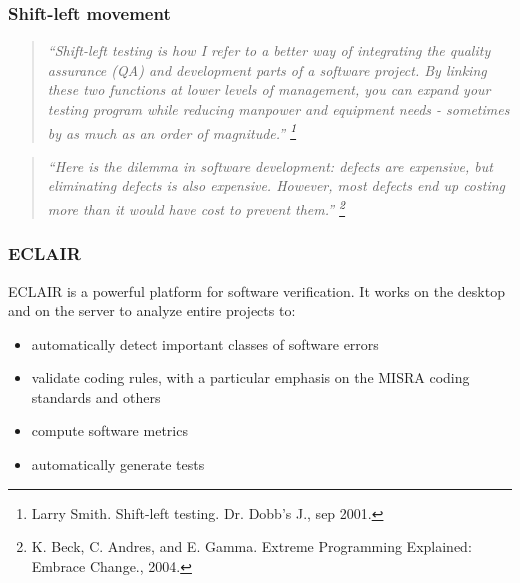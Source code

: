 \documentclass[compress,xcolor={dvipsnames}]{beamer}
\newenvironment{emphcolor}
               {\usebeamercolor[fg]{title}}
               {\usebeamercolor[fg]{text}}
\begin{document}
\begin{frame}
  \frametitle{Shift-left movement}

  \begin{quote}
    \itshape
    ``Shift-left testing is how I refer to a better way of integrating the quality assurance (QA) and development parts of a software project.  By linking these two functions at lower levels of management, you can expand your testing program while reducing manpower and equipment needs - sometimes by as much as an order of magnitude.'' \footnote{Larry Smith. Shift-left testing. Dr. Dobb's J., sep 2001.}
  \end{quote}
  
  \vspace{1em}

  \begin{quote}
    \itshape
    ``Here is the dilemma in software development: defects are expensive, but eliminating defects is also expensive. However, most defects end up costing more than it would have cost to prevent them.'' \footnote{K. Beck, C. Andres, and E. Gamma. Extreme Programming Explained: Embrace Change., 2004.}
  \end{quote}
\end{frame}

\begin{frame}
  \frametitle{ECLAIR}

  ECLAIR is a powerful platform for software verification. It works on the desktop and on the server to analyze entire projects to:
  \begin{itemize}
    \setlength\itemsep{1em}
    \item automatically detect important classes of software errors
      
    \item validate coding rules, with a particular emphasis on the \begin{emphcolor}MISRA coding standards\end{emphcolor} and others
    
    \item compute software metrics

    \item automatically generate tests
  \end{itemize}
\end{frame}
\end{document}
